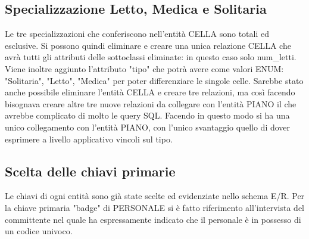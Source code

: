 \documentclass[a4paper,12pt]{report}
\begin{document}
\subsection{Specializzazione Letto, Medica e Solitaria}
Le tre specializzazioni che conferiscono nell'entità CELLA sono totali ed esclusive.
%
Si possono quindi eliminare e creare una unica relazione CELLA che avrà tutti gli attributi delle sottoclassi eliminate: in questo caso solo num\_letti.
%
Viene inoltre aggiunto l'attributo "tipo" che potrà avere come valori ENUM: "Solitaria", "Letto", "Medica" per poter differenziare le singole celle.
%
Sarebbe stato anche possibile eliminare l'entità CELLA e creare tre relazioni, ma così facendo bisognava creare altre tre nuove relazioni da collegare con l'entità PIANO il che avrebbe complicato di molto le query SQL.
%
Facendo in questo modo si ha una unico collegamento con l'entità PIANO, con l'unico svantaggio quello di dover esprimere a livello applicativo vincoli sul tipo.
\subsection{Scelta delle chiavi primarie}
Le chiavi di ogni entità sono già state scelte ed evidenziate nello schema E/R.
%
Per la chiave primaria "badge" di PERSONALE si è fatto riferimento all'intervista del committente nel quale ha espressamente indicato che il personale è in possesso di un codice univoco.
\end{document}
